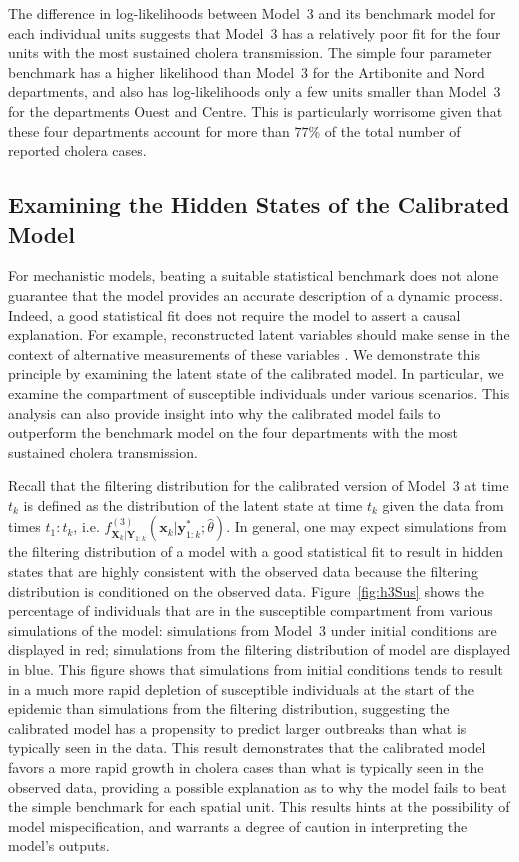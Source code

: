 The difference in log-likelihoods between Model~3 and its benchmark model for each individual units suggests that Model~3 has a relatively poor fit for the four units with the most sustained cholera transmission.
The simple four parameter benchmark has a higher likelihood than Model~3 for the Artibonite and Nord departments, and also has log-likelihoods only a few units smaller than Model~3 for the departments Ouest and Centre.
This is particularly worrisome given that these four departments account for more than $77\%$ of the total number of reported cholera cases.

\subsection{Examining the Hidden States of the Calibrated Model}

For mechanistic models, beating a suitable statistical benchmark does not alone guarantee that the model provides an accurate description of a dynamic process.
Indeed, a good statistical fit does not require the model to assert a causal explanation.
For example, reconstructed latent variables should make sense in the context of alternative measurements of these variables \cite{grad12}.
We demonstrate this principle by examining the latent state of the calibrated model.
In particular, we examine the compartment of susceptible individuals under various scenarios.
This analysis can also provide insight into why the calibrated model fails to outperform the benchmark model on the four departments with the most sustained cholera transmission.

Recall that the filtering distribution for the calibrated version of Model~3 at time $t_k$ is defined as the distribution of the latent state at time $t_k$ given the data from times $t_{1}:t_{k}$, i.e. $f^{(3)}_{\bm{X}_k|\bm{Y}_{1:k}}(\bm{x}_{k} | \bm{y}^*_{1:k} ; \hat\theta)$.
In general, one may expect simulations from the filtering distribution of a model with a good statistical fit to result in hidden states that are highly consistent with the observed data because the filtering distribution is conditioned on the observed data.
Figure~\ref{fig:h3Sus} shows the percentage of individuals that are in the susceptible compartment from various simulations of the model:
simulations from Model~3 under initial conditions are displayed in red; simulations from the filtering distribution of model are displayed in blue.
This figure shows that simulations from initial conditions tends to result in a much more rapid depletion of susceptible individuals at the start of the epidemic than simulations from the filtering distribution, suggesting the calibrated model has a propensity to predict larger outbreaks than what is typically seen in the data.
This result demonstrates that the calibrated model favors a more rapid growth in cholera cases than what is typically seen in the observed data, providing a possible explanation as to why the model fails to beat the simple benchmark for each spatial unit.
This results hints at the possibility of model mispecification, and warrants a degree of caution in interpreting the model's outputs.



